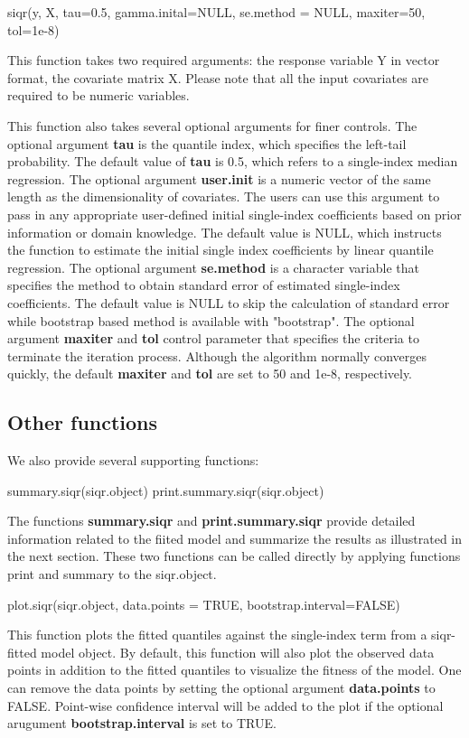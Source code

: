 \begin{example}
  siqr(y, X, tau=0.5, gamma.inital=NULL, se.method = NULL, maxiter=50, tol=1e-8)
\end{example}

This function takes two required arguments: the response variable Y in vector format, the covariate matrix X. Please note that all the input covariates are required to be numeric variables. 

This function also takes several optional arguments for finer controls. The optional argument \textbf{tau} is the quantile index, which specifies the left-tail probability. The default value of \textbf{tau} is 0.5, which refers to a single-index median regression.  The optional argument \textbf{user.init} is a numeric vector of the same length as the dimensionality of covariates. The users can use this argument to pass in any appropriate user-defined initial single-index coefficients based on prior information or domain knowledge. The default value is NULL, which instructs the function to estimate the initial single index coefficients by linear quantile regression. The optional argument \textbf{se.method} is a character variable that specifies the method to obtain standard error of estimated single-index coefficients. The default value is NULL to skip the calculation of standard error while bootstrap based method is available with "bootstrap". The optional argument \textbf{maxiter} and \textbf{tol} control parameter that specifies the criteria to terminate the iteration process. Although the algorithm normally converges quickly, the default \textbf{maxiter} and \textbf{tol} are set to 50 and 1e-8, respectively.

\subsection{Other functions}

We also provide several supporting functions:

\begin{example}
  summary.siqr(siqr.object)
  print.summary.siqr(siqr.object)
\end{example}
The functions \textbf{summary.siqr} and \textbf{print.summary.siqr} provide detailed information related to the fiited model and summarize the results as illustrated in the next section. These two functions can be called directly by applying functions print and summary to the siqr.object. 

\begin{example}
  plot.siqr(siqr.object, data.points = TRUE, bootstrap.interval=FALSE)
\end{example}
This function plots the fitted quantiles against the single-index term from a siqr-fitted model object. By default, this function will also plot the observed data points in addition to the fitted quantiles to visualize the fitness of the model. One can remove the data points by setting the optional argument \textbf{data.points} to FALSE. Point-wise confidence interval will be added to the plot if the optional arugument \textbf{bootstrap.interval} is set to TRUE. 



